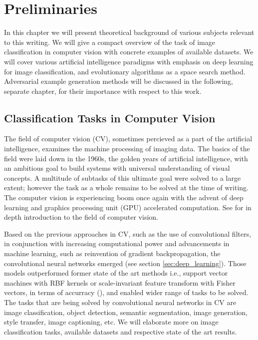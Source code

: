 \chapter{Preliminaries}
\label{sec:preliminaries}
In this chapter we will present theoretical background of various subjects relevant to this writing. We will give a compact overview of the task of image classification in computer vision with concrete examples of available datasets. We will cover various artificial intelligence paradigms with emphasis on deep learning for image classification, and evolutionary algorithms as a space search method. Adversarial example generation methods will be discussed in the following, separate chapter, for their importance with respect to this work.

\section{Classification Tasks in Computer Vision}
\label{sec:cv}
The field of computer vision (CV), sometimes percieved as a part of the artificial intelligence, examines the machine processing of imaging data. The basics of the field were laid down in the 1960s, the golden years of artificial intelligence, with an ambitious goal to build systems with universal understanding of visual concepts. A multitude of subtasks of this ultimate goal were solved to a large extent; however the task as a whole remains to be solved at the time of writing. The computer vision is experiencing boom once again with the advent of deep learning and graphics processing unit (GPU) accelerated computation. See \cite{computer_vision} for in depth introduction to the field of computer vision.

Based on the previous approaches in CV, such as the use of convolutional filters, in conjunction with increasing computational power and advancements in machine learning, such as reinvention of gradient backpropagation, the convolutional neural networks emerged (see section \ref{sec:deep_learning}). Those models outperformed former state of the art methods i.e., support vector machines with RBF kernels or scale-invariant feature transform with Fisher vectors, in terms of accurracy (\cite{NIPS2012_4824}), and enabled wider range of tasks to be solved. The tasks that are being solved by convolutional neural networks in CV are image classification, object detection, semantic segmentation, image generation, style transfer, image captioning, etc. We will elaborate more on image classification tasks, available datasets and respective state of the art results.

